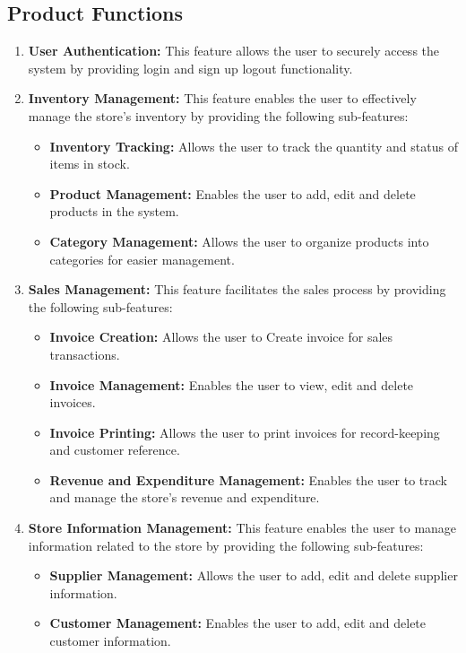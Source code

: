 \documentclass[../thesis.tex]{subfiles}
\begin{document}
\subsection{Product Functions}

\begin{enumerate}
    \item \textbf{User Authentication:} This feature allows the user to securely access the system by providing login and sign up logout functionality.
    \item \textbf{Inventory Management:} This feature enables the user to effectively manage the store's inventory by providing the following sub-features:
          \begin{itemize}
              \item \textbf{Inventory Tracking:} Allows the user to track the quantity and status of items in stock.
              \item \textbf{Product Management:} Enables the user to add, edit and delete products in the system.
              \item \textbf{Category Management:} Allows the user to organize products into categories for easier management.
          \end{itemize}
    \item \textbf{Sales Management:} This feature facilitates the sales process by providing the following sub-features:
          \begin{itemize}
              \item \textbf{Invoice Creation:} Allows the user to Create invoice for sales transactions.
              \item \textbf{Invoice Management:} Enables the user to view, edit and delete invoices.
              \item \textbf{Invoice Printing:} Allows the user to print invoices for record-keeping and customer reference.
              \item \textbf{Revenue and Expenditure Management:} Enables the user to track and manage the store's revenue and expenditure.
          \end{itemize}
    \item \textbf{Store Information Management:} This feature enables the user to manage information related to the store by providing the following sub-features:
          \begin{itemize} \item \textbf{Supplier Management:} Allows the user to add, edit and delete supplier information.
              \item \textbf{Customer Management:} Enables the user to add, edit and delete customer information.

          \end{itemize}

\end{enumerate}
\end{document}
